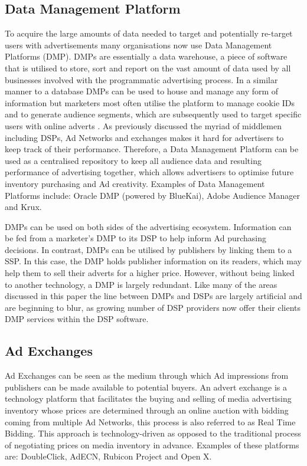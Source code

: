 \documentclass[12pt]{article}
\begin{document}
\subsection{Data Management Platform}
To acquire the large amounts of data needed to target and potentially re-target users with advertisements many organisations now use Data Management Platforms (DMP). DMPs are essentially a data warehouse, a piece of software that is utilised to store, sort and report on the vast amount of data used by all businesses involved with the programmatic advertising process. In a similar manner to a database DMPs can be used to house and manage any form of information but marketers most often utilise the platform to manage cookie IDs and to generate audience segments, which are subsequently used to target specific users with online adverts \parencite{DMP}. As previously discussed the myriad of middlemen including DSPs, Ad Networks and exchanges makes it hard for advertisers to keep track of their performance. Therefore, a Data Management Platform can be used as a centralised repository to keep all audience data and resulting performance of advertising together, which allows advertisers to optimise future inventory purchasing and Ad creativity. Examples of Data Management Platforms include: Oracle DMP (powered by BlueKai), Adobe Audience Manager and Krux. \newline

DMPs can be used on both sides of the advertising ecosystem. Information can be fed from a marketer's DMP to its DSP to help inform Ad purchasing decisions. In contrast, DMPs can be 
utilised by publishers by linking them to a SSP. In this case, the DMP holds publisher information on its readers, which may help them to sell their adverts for a higher price. However, without being linked to another technology, a DMP is largely redundant. Like many of the areas discussed in this paper the line between DMPs and DSPs are largely artificial and are beginning to blur, as growing number of DSP providers now offer their clients DMP services within the DSP software.  

\subsection{Ad Exchanges} \label{AdExchanges}
Ad Exchanges can be seen as the medium through which Ad impressions from publishers can be made available to potential buyers. An advert exchange is a technology platform that facilitates the buying and selling of media advertising inventory whose prices are determined through an online auction with bidding coming from multiple Ad Networks, this process is also referred to as Real Time Bidding. This approach is technology-driven as opposed to the traditional process of negotiating prices on media inventory in advance. Examples of these platforms are: DoubleClick, AdECN, Rubicon Project and Open X. \newline
\end{document}
